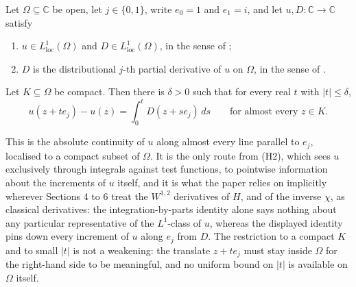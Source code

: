 \begin{lemma}
Let $\Omega\subseteq\mathbb{C}$ be open, let $j\in\{0,1\}$, write $e_0=1$ and
$e_1=i$, and let $u,D\colon\mathbb{C}\to\mathbb{C}$ satisfy
\begin{enumerate}
\item[(H1)] $u\in L^{1}_{\mathrm{loc}}(\Omega)$ and
  $D\in L^{1}_{\mathrm{loc}}(\Omega)$, in the sense of ;
\item[(H2)] $D$ is the distributional $j$-th partial derivative of $u$ on
  $\Omega$, in the sense of .
\end{enumerate}
Let $K\subseteq\Omega$ be compact.  Then there is $\delta>0$ such that for
every real $t$ with $|t|\le\delta$,
\[
  u(z+te_j)-u(z)=\int_0^tD(z+se_j)\,ds
  \qquad\text{for almost every }z\in K .
\]

This is the absolute continuity of $u$ along almost every line parallel to
$e_j$, localised to a compact subset of $\Omega$.  It is the only route from
(H2), which sees $u$ exclusively through integrals against test functions, to
pointwise information about the increments of $u$ itself, and it is what the
paper relies on implicitly wherever Sections 4 to 6 treat the
$W^{1,2}$ derivatives of $H$, and of the inverse $\chi$, as classical
derivatives: the integration-by-parts identity alone says nothing about any
particular representative of the $L^1$-class of $u$, whereas the displayed
identity pins down every increment of $u$ along $e_j$ from $D$.  The
restriction to a compact $K$ and to small $|t|$ is not a weakening: the
translate $z+te_j$ must stay inside $\Omega$ for the right-hand side to be
meaningful, and no uniform bound on $|t|$ is available on $\Omega$ itself.
\end{lemma}
